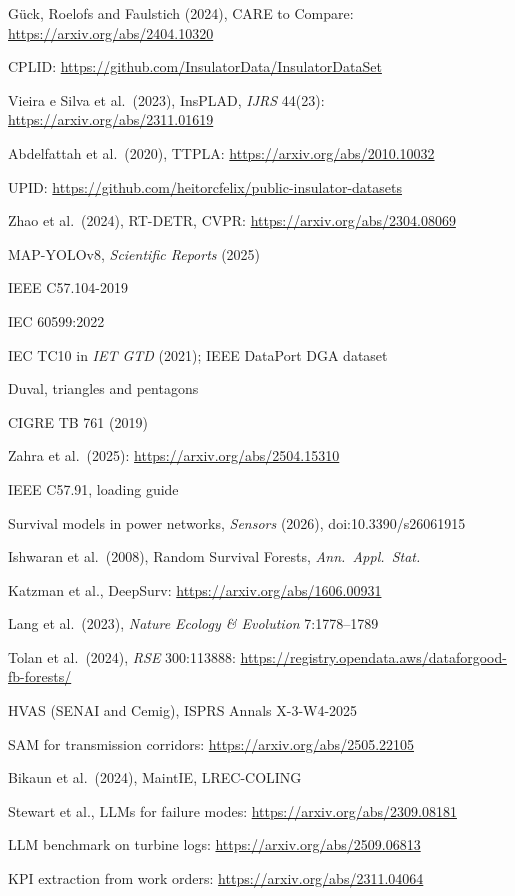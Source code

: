 {\begin{enumerate}[label={[\arabic*]},leftmargin=2.2em,itemsep=1pt]
\item Gück, Roelofs and Faulstich (2024), CARE to Compare: \url{https://arxiv.org/abs/2404.10320}
\item CPLID: \url{https://github.com/InsulatorData/InsulatorDataSet}
\item Vieira e Silva et al.\ (2023), InsPLAD, \emph{IJRS} 44(23): \url{https://arxiv.org/abs/2311.01619}
\item Abdelfattah et al.\ (2020), TTPLA: \url{https://arxiv.org/abs/2010.10032}
\item UPID: \url{https://github.com/heitorcfelix/public-insulator-datasets}
\item Zhao et al.\ (2024), RT-DETR, CVPR: \url{https://arxiv.org/abs/2304.08069}
\item MAP-YOLOv8, \emph{Scientific Reports} (2025)
\item IEEE C57.104-2019
\item IEC 60599:2022
\item IEC TC10 in \emph{IET GTD} (2021); IEEE DataPort DGA dataset
\item Duval, triangles and pentagons
\item CIGRE TB 761 (2019)
\item Zahra et al.\ (2025): \url{https://arxiv.org/abs/2504.15310}
\item IEEE C57.91, loading guide
\item Survival models in power networks, \emph{Sensors} (2026), doi:10.3390/s26061915
\item Ishwaran et al.\ (2008), Random Survival Forests, \emph{Ann.\ Appl.\ Stat.}
\item Katzman et al., DeepSurv: \url{https://arxiv.org/abs/1606.00931}
\item Lang et al.\ (2023), \emph{Nature Ecology \& Evolution} 7:1778--1789
\item Tolan et al.\ (2024), \emph{RSE} 300:113888: \url{https://registry.opendata.aws/dataforgood-fb-forests/}
\item HVAS (SENAI and Cemig), ISPRS Annals X-3-W4-2025
\item SAM for transmission corridors: \url{https://arxiv.org/abs/2505.22105}
\item Bikaun et al.\ (2024), MaintIE, LREC-COLING
\item Stewart et al., LLMs for failure modes: \url{https://arxiv.org/abs/2309.08181}
\item LLM benchmark on turbine logs: \url{https://arxiv.org/abs/2509.06813}
\item KPI extraction from work orders: \url{https://arxiv.org/abs/2311.04064}

\end{enumerate}}
